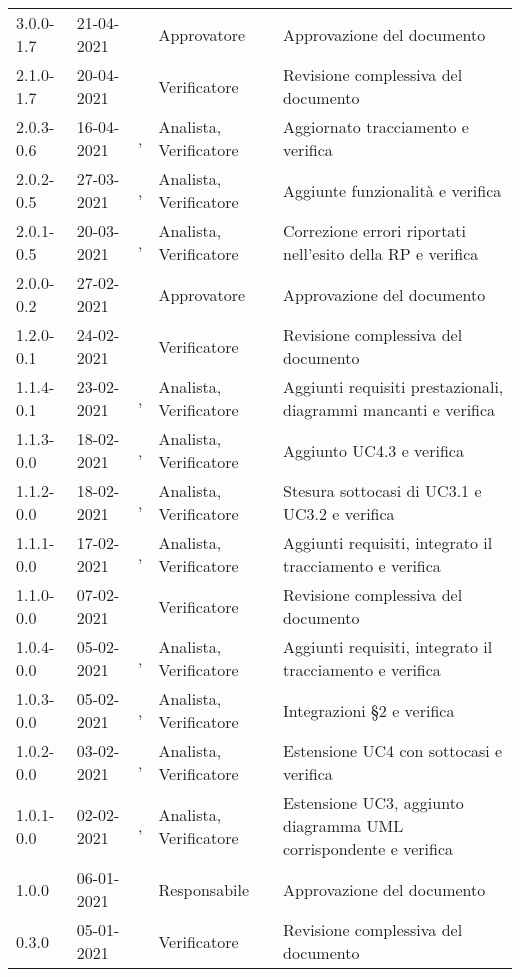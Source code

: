 {{\begin{longtable}{C{1.7cm} | C{2.5cm} | C{3.2cm} | C{2.7cm}  | C{4.8cm}}
3.0.0-1.7 & 21-04-2021 & \RA{} & Approvatore & Approvazione del documento\\
2.1.0-1.7 & 20-04-2021 & \SH{} & Verificatore & Revisione complessiva del documento\\
2.0.3-0.6 & 16-04-2021 & \SP{}, \BM{} & Analista, Verificatore & Aggiornato tracciamento e verifica\\
2.0.2-0.5 & 27-03-2021 & \SG{}, \BM{} & Analista, Verificatore & Aggiunte funzionalità e verifica\\
2.0.1-0.5 & 20-03-2021 & \SP{}, \BM{} & Analista, Verificatore & Correzione errori riportati nell'esito della RP e verifica\\
2.0.0-0.2 & 27-02-2021 & \ZM{} & Approvatore & Approvazione del documento\\
1.2.0-0.1 & 24-02-2021 & \SH{} & Verificatore & Revisione complessiva del documento\\
1.1.4-0.1 & 23-02-2021 & \RA{}, \SG{} & Analista, Verificatore & Aggiunti requisiti prestazionali, diagrammi mancanti e verifica\\
1.1.3-0.0 & 18-02-2021 & \PA{}, \SG{} & Analista, Verificatore & Aggiunto UC4.3 e verifica\\
1.1.2-0.0 & 18-02-2021 & \RA{}, \SG{} & Analista, Verificatore & Stesura sottocasi di UC3.1 e UC3.2 e verifica\\
1.1.1-0.0 & 17-02-2021 & \PA{}, \BM{} & Analista, Verificatore & Aggiunti requisiti, integrato il tracciamento e verifica\\
1.1.0-0.0 & 07-02-2021 & \SH{} & Verificatore & Revisione complessiva del documento\\
1.0.4-0.0 & 05-02-2021 & \PA{}, \BM{} & Analista, Verificatore & Aggiunti requisiti, integrato il tracciamento e verifica\\
1.0.3-0.0 & 05-02-2021 & \PA{}, \BM{} & Analista, Verificatore & Integrazioni  \S2 e verifica\\
1.0.2-0.0 & 03-02-2021 & \ZM{}, \SH{} & Analista, Verificatore & Estensione UC4 con sottocasi e verifica\\
1.0.1-0.0 & 02-02-2021 & \ZM{}, \SH{} & Analista, Verificatore & Estensione UC3, aggiunto diagramma UML corrispondente  e verifica\\
1.0.0 & 06-01-2021 & \BM{} & Responsabile & Approvazione del documento \\

0.3.0 & 05-01-2021 & \PA{} & Verificatore & Revisione complessiva del documento \\


\end{longtable}}}
